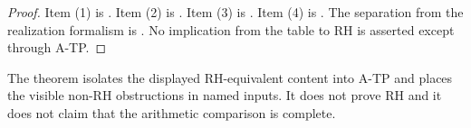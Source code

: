 \begin{proof}
Item (1) is . Item (2) is
. Item (3) is
. Item (4) is
. The separation from
the realization formalism is .
No implication from the table to RH is asserted except through A-TP.
\end{proof}

\begin{remark}
\label{v4-arith:w10-final:rem:not-rh}
The theorem isolates the displayed RH-equivalent content into A-TP and
places the visible non-RH obstructions in named inputs.  It does not
prove RH and it does not claim that the arithmetic comparison is
complete.
\end{remark}
